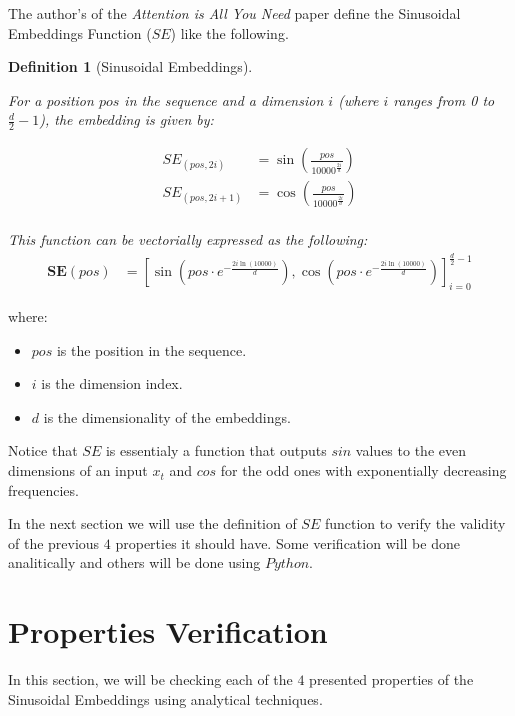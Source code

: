 \documentclass{article}
\newtheorem{definition}{Definition}[section]
\begin{document}
The author's of the \textit{Attention is All You Need} paper define the Sinusoidal Embeddings Function ($SE$) like the following.

\begin{definition}[Sinusoidal Embeddings]
	\label{def:sin_embedding}
	
	For a position \( pos \) in the sequence and a dimension \( i \) (where \( i \) ranges from 0 to \( \frac{d}{2}-1 \)), the embedding is given by:
	
	\begin{align}
		SE_{(pos, 2i)} &= \sin\left(\frac{pos}{10000^{\frac{2i}{d}}}\right) \\
		SE_{(pos, 2i+1)} &= \cos\left(\frac{pos}{10000^{\frac{2i}{d}}}\right) \\
	\end{align}
	
	This function can be vectorially expressed as the following: 
	\begin{align}
		\mathbf{SE}(pos) &= \left[ \sin\left(pos \cdot e^{- \frac{2i \ln(10000)}{d}}\right), \cos\left(pos \cdot e^{- \frac{2i \ln(10000)}{d}}\right) \right]_{i=0}^{\frac{d}{2}-1}
	\end{align}
	

\end{definition}

where:

\begin{itemize}
	\item \( pos \) is the position in the sequence.
	\item  \( i \) is the dimension index.
	\item  \( d \) is the dimensionality of the embeddings.
\end{itemize}


Notice that $SE$ is essentialy a function that outputs $sin$ values to the even dimensions of an input $x_t$ and $cos$ for the odd ones with exponentially decreasing frequencies.


In the next section we will use the definition of  $SE$ function to verify the validity of the previous $4$ properties it should have. Some verification will be done analitically and others will be done using $Python$.

\section{Properties Verification}

In this section, we will be checking each of the $4$ presented properties of the Sinusoidal Embeddings using analytical techniques.
\end{document}
